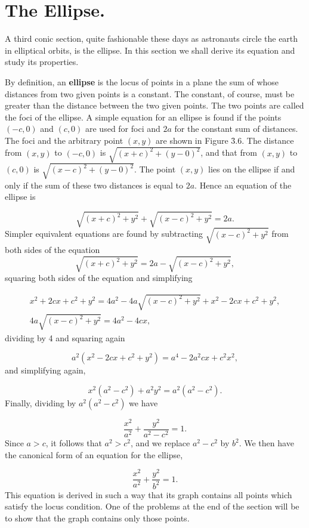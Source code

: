 \section{The Ellipse.}\label{sec 3.3} 
 A third conic section, quite fashionable these days as astronauts circle the earth in elliptical orbits, is the ellipse. In this section we shall derive its equation and study its properties.

By definition, an \textbf{ellipse} is the locus of points in a plane the sum of whose distances from two given points is a constant. The constant, of course, must be greater than the distance between the two given points. The two points are called the foci of the ellipse. A simple equation for an ellipse is found if the points $(-c, 0)$ and $(c, 0)$ are used for foci and $2a$ for the constant sum of distances. The foci and the arbitrary point $(x, y)$ are shown in Figure \f{3.6}. The distance from $(x, y)$ to $(-c, 0)$ is $\sqrt{(x + c)^2 + (y - 0)^2}$, and that from $(x, y)$ to $(c, 0)$ is $\sqrt{(x - c)^2 + (y - 0)^2}$. The point $(x, y)$ lies on the ellipse if and only if the sum of these two distances is equal to $2a$. Hence an equation of the ellipse is


$$
\sqrt{(x + c)^2 + y^2} + \sqrt{(x - c)^2 + y^2} = 2a.
$$
\noindent Simpler equivalent equations are found by subtracting $\sqrt{(x - c)^2 + y^2}$ from both sides of the equation
$$
\sqrt{(x + c)^2 + y^2} = 2a - \sqrt{(x - c)^2 + y^2},
$$
\noindent squaring both sides of the equation and simplifying 

$$
\begin{array}{c}
x^2 + 2cx + c^2 + y^2 = 4a^2 - 4a\sqrt{(x - c)^2 + y^2} + x^2 - 2cx + c^2 + y^2,\\
4a\sqrt{(x-c)^2 + y^2} = 4a^2 - 4cx, 
\end{array}
$$
\noindent dividing by 4 and squaring again

$$
a^2(x^2 - 2cx + c^2 + y^2) = a^4 - 2{a^2}cx + c^2{x^2},
$$
\noindent and simplifying again, 

$$
x^2(a^2 - c^2) + a^2y^2 = a^2(a^2 - c^2).
$$
\noindent Finally, dividing by $a^2(a^2 - c^2)$ we have 

$$
\frac{x^2}{a^2} + \frac{y^2}{a^2 - c^2} = 1.
$$
\noindent Since $a > c$, it follows that $a^2 > c^2$, and we replace $a^2 - c^2$ by $b^2$. We then have the canonical form of an equation for the ellipse,

$$
\frac{x^2}{a^2} + \frac{y^2}{b^2} = 1.
$$
\noindent This equation is derived in such a way that its graph contains all points which satisfy the locus condition. One of the problems at the end of the section will be to show that the graph contains only those points.

